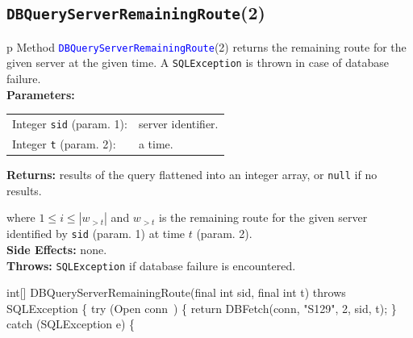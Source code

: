 \subsection{{\tt{}\protect{}DBQueryServerRemainingRoute}(2)}
\begin{tabular}{p{\textwidth}}
\toprule
{}
Method \textcolor{blue}{{\tt{}\protect{}DBQueryServerRemainingRoute}}(2) returns the
remaining route for the given server at the given time.
A {\tt{}SQLException} is thrown in case of database failure.\\
\midrule
\textbf{Parameters:} \\
\begin{tabular}{lp{116mm}}
Integer {\tt{}sid} (param. 1):&server identifier.\\
Integer {\tt{}t} (param. 2):&a time.\\
\end{tabular}
\textbf{Returns:} results of the query flattened into an integer array,
or {\tt{}null} if no results.


where $1\leq i\leq |w_{>t}|$ and $w_{>t}$ is the remaining route for the
given server identified by {\tt{}sid} (param. 1) at time $t$ (param. 2).\\
\textbf{Side Effects:} none.\\
\textbf{Throws:} {\tt{}SQLException} if database failure is encountered.\\
\bottomrule
\end{tabular}
\nwenddocs{}\endmoddef{}
int[] DBQueryServerRemainingRoute(final int sid, final int t) throws SQLException \{
  try (\LA{}Open \code{}conn\edoc{}~{\nwtagstyle{}}\RA{}) \{
    return DBFetch(conn, "S129", 2, sid, t);
  \} catch (SQLException e) \{
